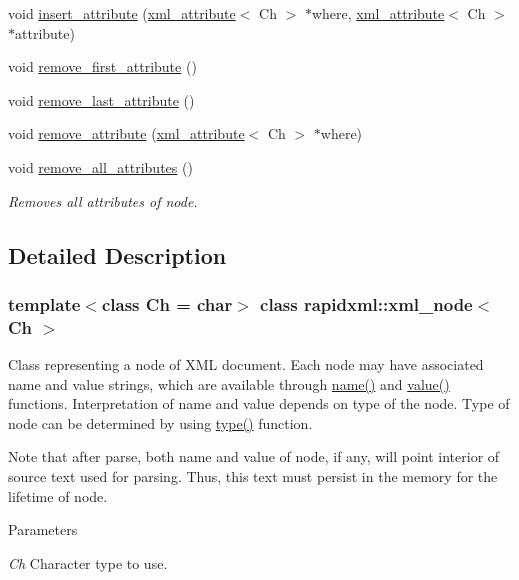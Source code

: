 \begin{DoxyCompactItemize}
\item 
void \hyperlink{classrapidxml_1_1xml__node_a9fe659cdf4a5b3bbf5e8ffc98db5a84f}{insert\_\-attribute} (\hyperlink{classrapidxml_1_1xml__attribute}{xml\_\-attribute}$<$ Ch $>$ $\ast$where, \hyperlink{classrapidxml_1_1xml__attribute}{xml\_\-attribute}$<$ Ch $>$ $\ast$attribute)
\item 
void \hyperlink{classrapidxml_1_1xml__node_aa95192d2a165cca16c551ed2a2a06aec}{remove\_\-first\_\-attribute} ()
\item 
void \hyperlink{classrapidxml_1_1xml__node_a1781a2cbedc9a51d609ad5b528125635}{remove\_\-last\_\-attribute} ()
\item 
void \hyperlink{classrapidxml_1_1xml__node_a6f97b1b4f46a94a4587915df3c0c6b57}{remove\_\-attribute} (\hyperlink{classrapidxml_1_1xml__attribute}{xml\_\-attribute}$<$ Ch $>$ $\ast$where)
\item 
void \hyperlink{classrapidxml_1_1xml__node_aa8d5d9484aa1eb5ff1841a073c84c1aa}{remove\_\-all\_\-attributes} ()
\begin{DoxyCompactList}\small\item\em Removes all attributes of node. \item\end{DoxyCompactList}\end{DoxyCompactItemize}


\subsection{Detailed Description}
\subsubsection*{template$<$class Ch = char$>$ class rapidxml::xml\_\-node$<$ Ch $>$}

Class representing a node of XML document. Each node may have associated name and value strings, which are available through \hyperlink{classrapidxml_1_1xml__base_a9a09739310469995db078ebd0da3ed45}{name()} and \hyperlink{classrapidxml_1_1xml__base_adcdaccff61c665f039d9344e447b7445}{value()} functions. Interpretation of name and value depends on type of the node. Type of node can be determined by using \hyperlink{classrapidxml_1_1xml__node_a2c6a4315b98bcfa2e04fed3fa1b22c36}{type()} function. \par
\par
 Note that after parse, both name and value of node, if any, will point interior of source text used for parsing. Thus, this text must persist in the memory for the lifetime of node. 
\begin{DoxyParams}{Parameters}
\item[{\em Ch}]Character type to use. \end{DoxyParams}


